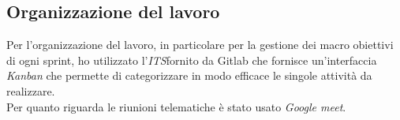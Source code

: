 \subsection{Organizzazione del lavoro}
Per l'organizzazione del lavoro, in particolare per la gestione dei macro obiettivi di ogni sprint, ho utilizzato l'\emph{ITS}\glosp fornito da Gitlab che fornisce un'interfaccia \emph{Kanban} che permette di categorizzare in modo efficace le singole attività da realizzare. \\
Per quanto riguarda le riunioni telematiche è stato usato  \emph{Google meet}.

























